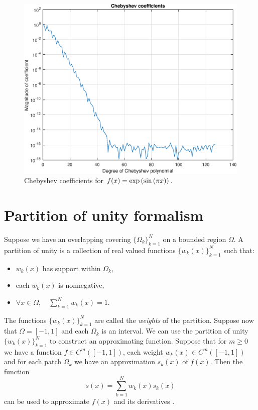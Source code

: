\begin{figure}[!htb]
\centering
\includegraphics[scale = 0.5]{Chapter1/coeff_plot.eps}
\caption{Chebyshev coefficients for $f(x)=\exp \left( \sin \left( \pi x \right) \right)$.}
\label{Coeff_example}
\end{figure}

\section{Partition of unity formalism}
\label{PUM_FORM_SEC}
 Suppose we have an overlapping covering $\{ \Omega_k \}_{k=1}^N$ on a bounded region $\Omega$. A partition of unity is a collection of real valued functions $\{w_k(x)\}_{k=1}^N$ such that:
\begin{itemize}
\item $w_k(x)$ has support within $\Omega_k$,
\item each $w_k(x)$ is nonnegative,
\item $\forall x \in \Omega, \quad \sum_{k=1}^N w_k(x)=1$.
\end{itemize}
The functions $\{w_k(x)\}_{k=1}^N$ are called the \textit{weights} of the partition. Suppose now that $\Omega=[-1,1]$ and each $\Omega_k$ is an interval. We can use the partition of unity $\{w_k(x)\}_{k=1}^N$ to construct an approximating function. Suppose that for $m \geq 0$ we have a function $f \in C^{m}([-1,1])$, each weight $w_k(x)\in C^{m}([-1,1])$ and for each patch $\Omega_k$ we have an approximation $s_k(x)$ of $f(x)$. Then the function
\begin{equation}
\label{POUAPPROX}
s(x) = \sum_{k=1}^N w_k(x)s_k(x)
\end{equation}
can be used to approximate $f(x)$ and its derivatives \cite{wendland2004scattered}.

